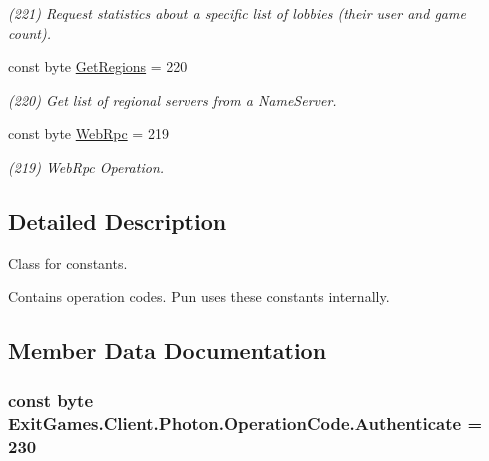 \begin{DoxyCompactItemize}
\begin{DoxyCompactList}\small\item\em (221) Request statistics about a specific list of lobbies (their user and game count).\end{DoxyCompactList}\item 
const byte \hyperlink{class_exit_games_1_1_client_1_1_photon_1_1_operation_code_a47ec5b6ce3097f6c31a440d679a39bd5}{Get\+Regions} = 220
\begin{DoxyCompactList}\small\item\em (220) Get list of regional servers from a Name\+Server.\end{DoxyCompactList}\item 
const byte \hyperlink{class_exit_games_1_1_client_1_1_photon_1_1_operation_code_af3a967de533671c1a5b04c698c19c84b}{Web\+Rpc} = 219
\begin{DoxyCompactList}\small\item\em (219) Web\+Rpc Operation.\end{DoxyCompactList}\end{DoxyCompactItemize}


\subsection{Detailed Description}
Class for constants. 

Contains operation codes. Pun uses these constants internally. 

\subsection{Member Data Documentation}
\subsubsection[{\texorpdfstring{Authenticate}{Authenticate}}]{\setlength{\rightskip}{0pt plus 5cm}const byte Exit\+Games.\+Client.\+Photon.\+Operation\+Code.\+Authenticate = 230}\hypertarget{class_exit_games_1_1_client_1_1_photon_1_1_operation_code_a593c0164845113e55d36c4ab792620b9}{}\label{class_exit_games_1_1_client_1_1_photon_1_1_operation_code_a593c0164845113e55d36c4ab792620b9}


